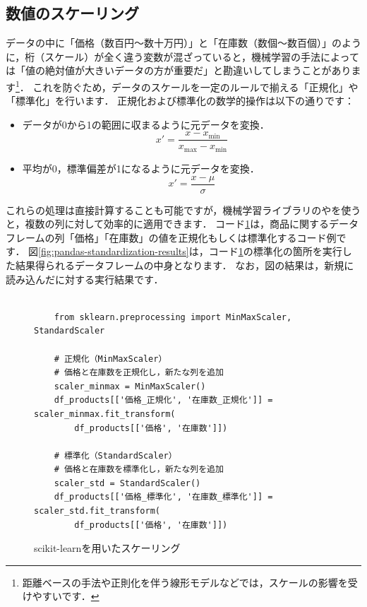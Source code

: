 \subsection{数値のスケーリング}
データの中に「価格（数百円〜数十万円）」と「在庫数（数個〜数百個）」のように，桁（スケール）が全く違う変数が混ざっていると，機械学習の手法によっては「値の絶対値が大きいデータの方が重要だ」と勘違いしてしまうことがあります\footnote{距離ベースの手法や正則化を伴う線形モデルなどでは，スケールの影響を受けやすいです．}．
これを防ぐため，データのスケールを一定のルールで揃える「正規化」や「標準化」を行います．
正規化および標準化の数学的操作は以下の通りです：
\begin{itemize}
    \item {} データが0から1の範囲に収まるように元データを変換．
    \begin{equation}
        x' = \frac{x - x_{\min}}{x_{\max} - x_{\min}}
        \label{eq:normalization}
    \end{equation}
    \item {} 平均が0，標準偏差が1になるように元データを変換．
    \begin{equation}
        x' = \frac{x - \mu}{\sigma}
        \label{eq:standardization}
    \end{equation}
\end{itemize}

これらの処理は直接計算することも可能ですが，機械学習ライブラリのやを使うと，複数の列に対して効率的に適用できます．
コード\ref{code:pandas-sklearn-scaling}は，商品に関するデータフレームの列「価格」「在庫数」の値を正規化もしくは標準化するコード例です．
図\ref{fig:pandas-standardization-results}は，コード\ref{code:pandas-sklearn-scaling}の標準化の箇所を実行した結果得られるデータフレームの中身となります．
なお，図の結果は，新規に読み込んだに対する実行結果です．

\begin{figure}[!htbp]
    \begin{verbatim}

    from sklearn.preprocessing import MinMaxScaler, StandardScaler

    # 正規化（MinMaxScaler）
    # 価格と在庫数を正規化し，新たな列を追加
    scaler_minmax = MinMaxScaler()
    df_products[['価格_正規化', '在庫数_正規化']] = scaler_minmax.fit_transform(
        df_products[['価格', '在庫数']])

    # 標準化（StandardScaler）
    # 価格と在庫数を標準化し，新たな列を追加
    scaler_std = StandardScaler()
    df_products[['価格_標準化', '在庫数_標準化']] = scaler_std.fit_transform(
        df_products[['価格', '在庫数']])

    \end{verbatim}
    \captionsetup{name=コード}
    \caption{scikit-learnを用いたスケーリング}
    \label{code:pandas-sklearn-scaling}
\end{figure}

